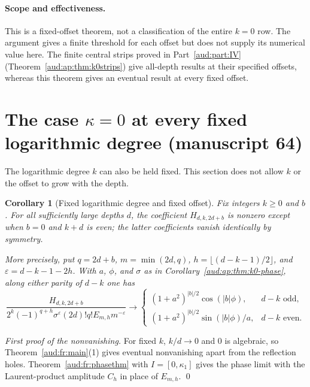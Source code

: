 \documentclass[11pt,a4paper]{article}
\numberwithin{equation}{section}
\newtheorem{corollary}[theorem]{Corollary}
\begin{document}
\paragraph{Scope and effectiveness.}
This is a fixed-offset theorem, not a classification of the entire $k=0$ row. The argument gives a finite threshold for each offset but does not supply its numerical value here. The finite central strips proved in Part~\ref{aud:part:IV} (Theorem~\ref{aud:ap:thm:k0strips}) give all-depth results at their specified offsets, whereas this theorem gives an eventual result at every fixed offset.

\section{The case \texorpdfstring{$\kappa=0$}{kappa=0} at every fixed logarithmic degree (manuscript 64)}\label{aud:sec:kappa0k}
The logarithmic degree $k$ can also be held fixed. This section does not allow $k$ or the offset to grow with the depth.

\begin{corollary}[Fixed logarithmic degree and fixed offset]\label{aud:ap:thm:fixed-k-phase}
Fix integers $k\ge0$ and $b$. For all sufficiently large depths $d$, the coefficient $H_{d,k,2d+b}$ is nonzero except when $b=0$ and $k+d$ is even; the latter coefficients vanish identically by symmetry.

More precisely, put $q=2d+b$, $m=\min(2d,q)$,
$h=\lfloor(d-k-1)/2\rfloor$, and $\varepsilon=d-k-1-2h$. With $a$, $\phi$, and $\sigma$ as in Corollary~\ref{aud:ap:thm:k0-phase}, along either parity of $d-k$ one has
\[
 \frac{H_{d,k,2d+b}}
 {2^k(-1)^{q+h}\sigma^\varepsilon(2d)!q!E_{m,h}m^{-\varepsilon}}
 \longrightarrow
 \begin{cases}
 (1+a^2)^{|b|/2}\cos(|b|\phi),&d-k\text{ odd},\\
 (1+a^2)^{|b|/2}\sin(|b|\phi)/a,&d-k\text{ even}.
 \end{cases}
\]
\end{corollary}
\emph{First proof of the nonvanishing.} For fixed $k$, $k/d\to0$ and $0$ is algebraic, so Theorem~\ref{aud:fr:main}(1) gives eventual nonvanishing apart from the reflection holes. Theorem~\ref{aud:fr:phasethm} with $I=[0,\kappa_1]$ gives the phase limit with the Laurent-product amplitude $C_h$ in place of $E_{m,h}$. \qed
\end{document}
